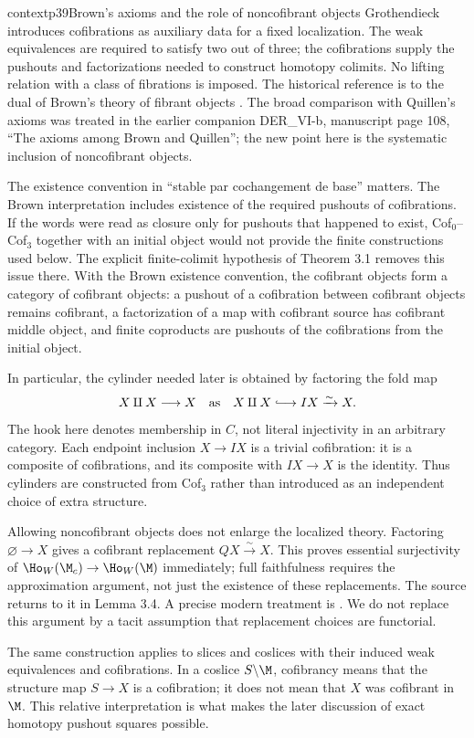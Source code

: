 \begin{dcomment}{context}{p39}{Brown's axioms and the role of noncofibrant objects}
Grothendieck introduces cofibrations as auxiliary data for a fixed localization. The weak equivalences are required to satisfy two out of three; the cofibrations supply the pushouts and factorizations needed to construct homotopy colimits. No lifting relation with a class of fibrations is imposed. The historical reference is to the dual of Brown's theory of fibrant objects \citep{Brown1973}. The broad comparison with Quillen's axioms was treated in the earlier companion DER\_VI-b, manuscript page 108, ``The axioms among Brown and Quillen''; the new point here is the systematic inclusion of noncofibrant objects.

The existence convention in ``stable par cochangement de base'' matters. The Brown interpretation includes existence of the required pushouts of cofibrations. If the words were read as closure only for pushouts that happened to exist, Cof$_0$--Cof$_3$ together with an initial object would not provide the finite constructions used below. The explicit finite-colimit hypothesis of Theorem 3.1 removes this issue there. With the Brown existence convention, the cofibrant objects form a category of cofibrant objects: a pushout of a cofibration between cofibrant objects remains cofibrant, a factorization of a map with cofibrant source has cofibrant middle object, and finite coproducts are pushouts of the cofibrations from the initial object.

In particular, the cylinder needed later is obtained by factoring the fold map
\[
 X\amalg X\longrightarrow X
 \quad\hbox{as}\quad
 X\amalg X\lhook\joinrel\longrightarrow IX\xrightarrow{\sim}X.
\]
The hook here denotes membership in $C$, not literal injectivity in an arbitrary category. Each endpoint inclusion $X\to IX$ is a trivial cofibration: it is a composite of cofibrations, and its composite with $IX\to X$ is the identity. Thus cylinders are constructed from Cof$_3$ rather than introduced as an independent choice of extra structure.

Allowing noncofibrant objects does not enlarge the localized theory. Factoring $\varnothing\to X$ gives a cofibrant replacement $QX\xrightarrow{\sim}X$. This proves essential surjectivity of $\Ho_W(\M_c)\to\Ho_W(\M)$ immediately; full faithfulness requires the approximation argument, not just the existence of these replacements. The source returns to it in Lemma 3.4. A precise modern treatment is \citet[Theorem 6.1.6]{RadulescuBanu2009}. We do not replace this argument by a tacit assumption that replacement choices are functorial.

The same construction applies to slices and coslices with their induced weak equivalences and cofibrations. In a coslice $S\backslash\M$, cofibrancy means that the structure map $S\to X$ is a cofibration; it does not mean that $X$ was cofibrant in $\M$. This relative interpretation is what makes the later discussion of exact homotopy pushout squares possible.
\end{dcomment}

